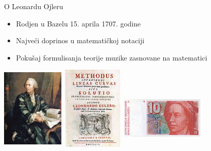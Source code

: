 \documentclass[xcolor=dvipsnames]{beamer}
\begin{document}
\begin{frame}
\begin{block}{O Leonardu Ojleru}
    \begin{itemize}
        \item Rodjen u Bazelu 15. aprila 1707. godine
        \item Najveći doprinos u matematičkoj notaciji
        \item Pokušaj formulisanja teorije muzike zasnovane na matematici
    \end{itemize}
\end{block}
\vspace{5mm}
 \includegraphics[height = 4cm, width = 3cm]{lojlermodified.jpg}
  \includegraphics[height = 4cm, width = 3cm]{delo.png}
  \includegraphics[height = 3cm, width = 4cm] {image.jpg}

\end{frame}
\end{document}
